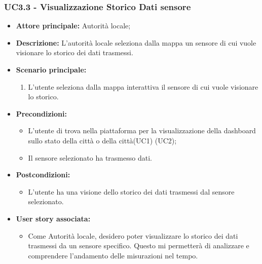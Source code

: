 \subsubsection{UC3.3 - Visualizzazione Storico Dati sensore}
\begin{itemize}
    \item \textbf{Attore principale:} Autorità locale;
    \item \textbf{Descrizione:} L’autorità locale seleziona dalla mappa un sensore di cui vuole visionare lo storico dei dati trasmessi.
    \item \textbf{Scenario principale:}
        \begin{enumerate}
            \item L'utente seleziona dalla mappa interattiva il sensore di cui vuole visionare lo storico.
        \end{enumerate}
    \item \textbf{Precondizioni:}
        \begin{itemize}
            \item  L'utente di trova  nella piattaforma per la visualizzazione della dashboard sullo stato della città o della città(UC1) (UC2);
            \item Il sensore selezionato ha trasmesso dati.
        \end{itemize}
    \item \textbf{Postcondizioni:}
        \begin{itemize}
            \item  L'utente ha una visione dello storico dei dati trasmessi dal sensore selezionato.
        \end{itemize}
    \item \textbf{User story associata:}
        \begin{itemize}
            \item Come Autorità locale, desidero poter visualizzare lo storico dei dati trasmessi da un sensore specifico. Questo mi permetterà di analizzare e comprendere l'andamento delle misurazioni nel tempo.
        \end{itemize}
\end{itemize}